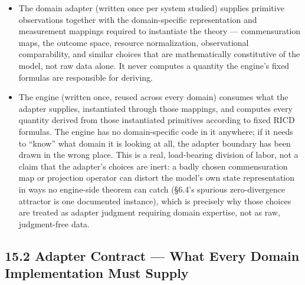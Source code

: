 \documentclass[
]{article}
\begin{document}
\begin{itemize}
\item
  The domain adapter (written once per system studied) supplies
  primitive observations together with the domain-specific
  representation and measurement mappings required to instantiate the
  theory --- commensuration maps, the outcome space, resource
  normalization, observational comparability, and similar choices that
  are mathematically constitutive of the model, not raw data alone. It
  never computes a quantity the engine's fixed formulas are responsible
  for deriving.
\item
  The engine (written once, reused across every domain) consumes what
  the adapter supplies, instantiated through those mappings, and
  computes every quantity derived from those instantiated primitives
  according to fixed RICD formulas. The engine has no domain-specific
  code in it anywhere; if it needs to ``know'' what domain it is looking
  at all, the adapter boundary has been drawn in the wrong place. This
  is a real, load-bearing division of labor, not a claim that the
  adapter's choices are inert: a badly chosen commensuration map or
  projection operator can distort the model's own state representation
  in ways no engine-side theorem can catch (§6.4's spurious
  zero-divergence attractor is one documented instance), which is
  precisely why those choices are treated as adapter judgment requiring
  domain expertise, not as raw, judgment-free data.
\end{itemize}

\hypertarget{adapter-contract-what-every-domain-implementation-must-supply}{%
\subsection{15.2 Adapter Contract --- What Every Domain Implementation
Must
Supply}\label{adapter-contract-what-every-domain-implementation-must-supply}}
\end{document}
